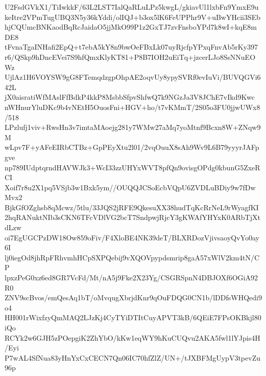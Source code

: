 U2FsdGVkX1/TiIwkkF/63L2LST7IalQaRLuLPz5kwgL/gkiavUl1lxbFn9YmxE9u
keItre2VPmTugUBQ3N5y36kYddi/olIQJ+b3ox5lK6FeUPPhr9V+uBwYHcii3SEb
hjCQUmcBNKaodBqRcJaidaO5jjMkO99P1z2GxTJ7zvFnsboYPd7k8wI+kqE8mDE8
tFvnaTgaINHafi2EpQ+t7ebA5kY8n9bwOeFBxLk07uyRjcfpYPxqFnvAb5rKy397
r6/QSkp9hDncEVei7S9hfQmxKlyKT81+P8B7IOH2uEiTq+jzcerLJo8SsNNuEOWz
UjlAz1H6VOYSW9gG8FTemqdzgpOhpAE2oqvUy8ypySVRf0evIuVi/BUVQGVi642L
jX0aisratiWfMAslFfBdkP4kkP8MsbbSfpvShfwQ7k9NGzJa3V8JChE7vIkd9Kwc
nWHnurYluDKc9b4vNEtH5OuosFni+HGV+ho/t7vKMmT/2S05o3FU0jjwUWx8/518
LPzlufj1viv+RwsHn3v7imtaMAoejg281y7WMw27aMq7yoMtnf9Bcxn8W+ZNqw9M
wLpv7F+yAFeEIRbCTBz+GpPEyXtu2l01/2vqOuuX8sAh9Wv9L6B79yyyrJAFpgve
np789IUdptqrndHAVWJk3+WcI33zzUHYxWVT8pfQn9ovisgOPdg0kbunG5ZxeRCI
Xoif7r8u2X1pq5VSjb3w1Bxk5ym//OUQQJCSoEcbVQpU6ZVDLuBDiy9w7fDwMvx2
BjkGfOZghsb8qMcwz/5tlu/33JQS2jRFE9QkesuXX38hudTqKcRrNeL9rWyagfKI
2hqRANuktNIb3sCKN6TFcVDlVG2bcT7SndpwjRjcY3gKWAfYHYxK0ARbTjXtdLzw
oi7EgUGCPzDW18Ow859oFiv/F4XloBE4NK39deT/BLXRDozVjivsaoyQvYo0ay6I
lj0iegOd8jhRpFRhvmhHCpSXPQebij9vXQOVpypdsmrip8gaA57xWlV2km4tN/CP
lpxzPeG0xz6ed8GR7VcFd/Mt/nA5j9Fke2X23Yg/CSGRSpnN4DBJOXf6OGiA92R0
ZNV9scBvos/emQesAq1bT/oMvqugXbrjdKnr9qOuFDQG0CN1b/lDDfsWHQedi9o4
HH001rWixfzyQmMAQ2LJzKj4CyTYiDTItCuyAPVT3kB/6QEiE7FPsOKBkjl80iQo
RCYk2w6GJH5zPOepgiK2ZhYbO/kKw1eqWY9hKuCUQvu2AKA5fwl1lYJpis4H/Eyi
P7wAL4SfNua83yHnYxCxCECN7Qn06IC70hfZlZ/UN+/tJXBFMgUypV3tpevZu96p

